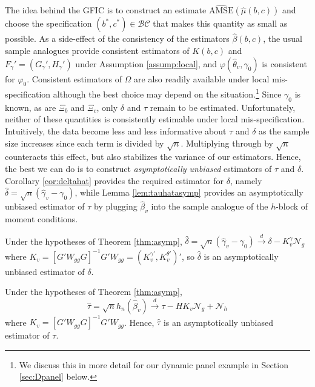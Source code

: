 The idea behind the GFIC is to construct an estimate $\widehat{\mbox{AMSE}}\left(\widehat{\mu}(b,c)\right)$ and choose the specification $(b^*,c^*)\in\mathcal{BC}$ that makes this quantity as small as possible. 
As a side-effect of the consistency of the estimators $\widehat{\beta}(b,c)$, the usual sample analogues provide consistent estimators of $K(b,c)$ and $F_{\gamma}' = (G_\gamma', H_\gamma')$ under Assumption \ref{assump:local}, and $\varphi(\widehat{\theta}_v,\gamma_0)$ is consistent for $\varphi_0$. 
Consistent estimators of $\Omega$ are also readily available under local mis-specification although the best choice may depend on the situation.\footnote{We discuss this in more detail for our dynamic panel example in Section \ref{sec:Dpanel} below.}
Since $\gamma_0$ is known, as are $\Xi_b$ and $\Xi_c$, only $\delta$ and $\tau$ remain to be estimated. 
Unfortunately, neither of these quantities is consistently estimable under local mis-specification. 
Intuitively, the data become less and less informative about $\tau$ and $\delta$ as the sample size increases since each term is divided by $\sqrt{n}$. 
Multiplying through by $\sqrt{n}$ counteracts this effect, but also stabilizes the variance of our estimators. 
Hence, the best we can do is to construct \emph{asymptotically unbiased} estimators of $\tau$ and $\delta$. 
Corollary \ref{cor:deltahat} provides the required estimator for $\delta$, namely $\widehat{\delta} = \sqrt{n}\left(\widehat{\gamma}_v - \gamma_0\right)$, while Lemma \ref{lem:tauhatasymp} provides an asymptotically unbiased estimator of $\tau$ by plugging $\widehat{\beta}_v$ into the sample analogue of the $h$-block of moment conditions.

\begin{cor} 
\label{cor:deltahat}
Under the hypotheses of Theorem \ref{thm:asymp},
	$\widehat{\delta} = \sqrt{n}\left(\widehat{\gamma}_v - \gamma_0\right) \overset{d}{\rightarrow} \delta - K_{v}^{\gamma} \mathscr{N}_g$
where 
$K_v = \left[G'W_{gg}G\right]^{-1}G'W_{gg} = \left(K_{v}^{\gamma '}, K_{v}^{\theta '}\right)'$, so $\widehat{\delta}$ is an asymptotically unbiased estimator of $\delta$.
\end{cor} 

\begin{lem}
\label{lem:tauhatasymp}
Under the hypotheses of Theorem \ref{thm:asymp},
	$$\widehat{\tau} = \sqrt{n}h_n\left(\widehat{\beta}_v\right) \overset{d}{\rightarrow} \tau - HK_v \mathscr{N}_g + \mathscr{N}_h$$
where $K_v = \left[G'W_{gg}G\right]^{-1}G'W_{gg}$. Hence, $\widehat{\tau}$ is an asymptotically unbiased estimator of $\tau$.
\end{lem}

